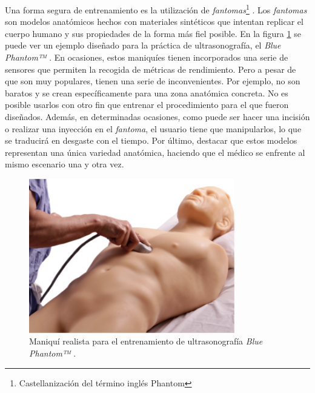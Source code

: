 Una forma segura de entrenamiento es la utilización de \emph{fantomas}\footnote{Castellanización del término inglés Phantom} \cite{phantomra}. 
Los \emph{fantomas} son modelos anatómicos hechos con materiales sintéticos que intentan replicar el cuerpo humano y sus propiedades de la forma más fiel posible. En la figura \ref{fig:phantom} se puede ver un ejemplo diseñado para la práctica de ultrasonografía, el \emph{Blue Phantom™} \cite{BluePH}. En ocasiones, estos maniquíes tienen incorporados una serie de sensores que permiten la recogida de métricas de rendimiento. Pero a pesar de que son muy populares, tienen una serie de inconvenientes. Por ejemplo, no son baratos y se crean específicamente para una zona anatómica concreta. No es posible usarlos con otro fin que entrenar el procedimiento para el que fueron diseñados. Además, en determinadas ocasiones, como puede ser hacer una incisión o realizar una inyección en el \emph{fantoma}, el usuario tiene que manipularlos, lo que se traducirá en desgaste con el tiempo. Por último, destacar que estos modelos representan una única variedad anatómica, haciendo que el médico se enfrente al mismo escenario una y otra vez.
\begin{figure}[ht]
   \centering
    \includegraphics[width=0.8\textwidth]{IMG/fast_trauma.jpg}
    \caption{Maniquí realista para el entrenamiento de ultrasonografía  \emph{Blue Phantom™} \cite{BluePH}. }
   \label{fig:phantom}
\end{figure}


